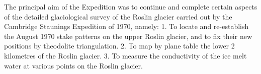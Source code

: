 The principal aim of the Expedition was to continue and complete certain aspects of the detailed glaciological survey of the Roslin glacier carried out by the Cambridge Staunings Expedition of 1970, namely: 1. To locate and re-establish the August 1970 stake patterns on the upper Roslin glacier, and to fix their new positions by theodolite triangulation. 2. To map by plane table the lower 2 kilometres of the Roslin glacier. 3. To measure the conductivity of the ice melt water at various points on the Roslin glacier.
